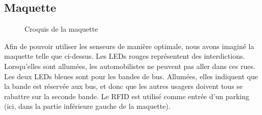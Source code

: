 \subsection{Maquette}
\begin{figure}[H]
    \begin{center}

        \caption{Croquis de la maquette}
    \end{center}
\end{figure}

Afin de pouvoir utiliser les senseurs de manière optimale, nous avons imaginé la maquette telle que ci-dessus. Les LEDs rouges représentent des interdictions. Lorsqu’elles sont allumées, les automobilistes ne peuvent pas aller dans ces rues. Les deux LEDs bleues sont pour les bandes de bus. Allumées, elles indiquent que la bande est réservée aux bus, et donc que les autres usagers doivent tous se rabattre sur la seconde bande. Le RFID est utilisé comme entrée d’un parking (ici, dans la partie inférieure gauche de la maquette).
